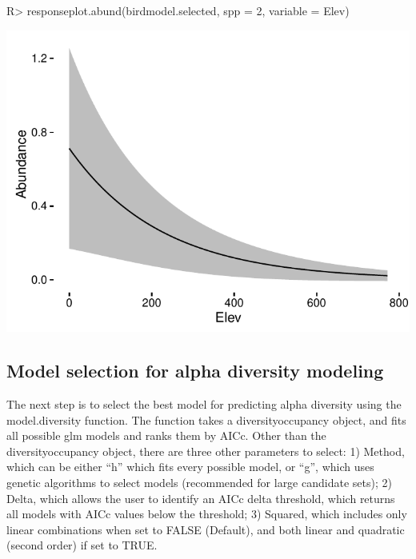 \documentclass[article]{jss}
\begin{document}
\begin{CodeChunk}

\begin{CodeInput}
R> responseplot.abund(birdmodel.selected, spp = 2, variable = Elev)
\end{CodeInput}


\begin{center}\includegraphics{diversityocc_files/figure-latex/unnamed-chunk-17-1} \end{center}

\end{CodeChunk}

\subsection{Model selection for alpha diversity
modeling}\label{model-selection-for-alpha-diversity-modeling}

The next step is to select the best model for predicting alpha diversity
using the model.diversity function. The function takes a
diversityoccupancy object, and fits all possible glm models and ranks
them by AICc. Other than the diversityoccupancy object, there are three
other parameters to select: 1) Method, which can be either ``h'' which
fits every possible model, or ``g'', which uses genetic algorithms to
select models (recommended for large candidate sets); 2) Delta, which
allows the user to identify an AICc delta threshold, which returns all
models with AICc values below the threshold; 3) Squared, which includes
only linear combinations when set to FALSE (Default), and both linear
and quadratic (second order) if set to TRUE.
\end{document}
